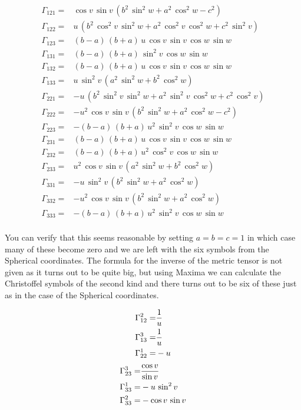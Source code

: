 {\begin{eqnarray*}
\Gamma_{121}=&\cos v\,\sin v\,\left(b^2\,\sin ^2w+a^2\,\cos ^2w
 -c^2\right)\\
\Gamma_{122}=&u\,\left(b^2\,\cos ^2v\,\sin ^2w+a^2\,\cos ^2v\,
 \cos ^2w+c^2\,\sin ^2v\right)\\
\Gamma_{123}=&\left(b-a\right)\,\left(b+a\right)\,u\,\cos v\,
 \sin v\,\cos w\,\sin w\\
\Gamma_{131}=&\left(b-a\right)\,\left(b+a\right)\,\sin ^2v\,
 \cos w\,\sin w\\
\Gamma_{132}=&\left(b-a\right)\,\left(b+a\right)\,u\,\cos v\,
 \sin v\,\cos w\,\sin w\\
\Gamma_{133}=&u\,\sin ^2v\,\left(a^2\,\sin ^2w+b^2\,\cos ^2w
 \right)\\
\Gamma_{221}=&-u\,\left(b^2\,\sin ^2v\,\sin ^2w+a^2\,\sin ^2v\,
 \cos ^2w+c^2\,\cos ^2v\right)\\
\Gamma_{222}=&-u^2\,\cos v\,\sin v\,\left(b^2\,\sin ^2w+a^2\,
 \cos ^2w-c^2\right)\\
\Gamma_{223}=&-\left(b-a\right)\,\left(b+a\right)\,u^2\,\sin ^2
 v\,\cos w\,\sin w\\
\Gamma_{231}=&\left(b-a\right)\,\left(b+a\right)\,u\,\cos v\,
 \sin v\,\cos w\,\sin w\\
\Gamma_{232}=&\left(b-a\right)\,\left(b+a\right)\,u^2\,\cos ^2v
 \,\cos w\,\sin w\\
\Gamma_{233}=&u^2\,\cos v\,\sin v\,\left(a^2\,\sin ^2w+b^2\,
 \cos ^2w\right)\\
\Gamma_{331}=&-u\,\sin ^2v\,\left(b^2\,\sin ^2w+a^2\,\cos ^2w
 \right)\\
\Gamma_{332}=&-u^2\,\cos v\,\sin v\,\left(b^2\,\sin ^2w+a^2\,
 \cos ^2w\right)\\
\Gamma_{333}=&-\left(b-a\right)\,\left(b+a\right)\,u^2\,\sin ^2
 v\,\cos w\,\sin w\\
\end{eqnarray*}

You can verify that this seems reasonable by setting $a=b=c=1$ in which case many of these
become zero and we are left with the six symbols from the Spherical coordinates. The formula
for the inverse of the metric tensor is not given as it turns out to be quite big, but using
Maxima we can calculate the Christoffel symbols of the second kind and there turns out to be six
of these just as in the case of the Spherical coordinates.

\begin{twocol}{
\begin{eqnarray*}
\Gamma_{12}^{2}=&{{1}\over{u}}\\
\Gamma_{13}^{3}=&{{1}\over{u}}\\
\Gamma_{22}^{1}=&-u\\
\end{eqnarray*}}{
\begin{eqnarray*}
\Gamma_{23}^{3}=&{{\cos v}\over{\sin v}}\\
\Gamma_{33}^{1}=&-u\,\sin ^2v\\
\Gamma_{33}^{2}=&-\cos v\,\sin v\\
\end{eqnarray*}}
\end{twocol}


}
